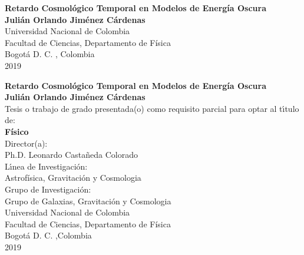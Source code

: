 \begin{center}
\begin{figure}
\centering%
%
\end{figure}
\thispagestyle{empty} \vspace*{2.0cm} \textbf{\huge
Retardo Cosmológico Temporal en Modelos de Energía Oscura}\\[6.0cm]
\Large\textbf{Juli\'an Orlando Jim\'enez C\'ardenas}\\[5.5cm]
\small Universidad Nacional de Colombia\\
Facultad de Ciencias, Departamento de F\'isica\\
Bogot\'a D. C. , Colombia\\
2019\\
\end{center}

\newpage{\pagestyle{empty}\cleardoublepage}
\newpage
\begin{center}
\thispagestyle{empty} \vspace*{0cm} \textbf{\huge
Retardo Cosmológico Temporal en Modelos de Energía Oscura}\\[3.0cm]
\Large\textbf{Juli\'an Orlando Jim\'enez C\'ardenas}\\[3.0cm]
\small Tesis o trabajo de grado presentada(o) como requisito parcial para optar al
t\'{\i}tulo de:\\
\textbf{F\'isico}\\[2.5cm]
Director(a):\\
Ph.D. Leonardo Casta\~{n}eda Colorado\\[2.0cm]
L\'{\i}nea de Investigaci\'{o}n: \\
Astrof\'isica, Gravitaci\'on y Cosmologia\\
Grupo de Investigaci\'{o}n:\\
Grupo de Galaxias, Gravitaci\'on y Cosmologia\\[2.5cm]
Universidad Nacional de Colombia\\
Facultad de Ciencias, Departamento de F\'isica\\
Bogot\'a D. C. ,Colombia\\
2019\\
\end{center}

\newpage{\pagestyle{empty}\cleardoublepage}

\newpage
\thispagestyle{empty} \textbf{}\normalsize
\\\\\\%

